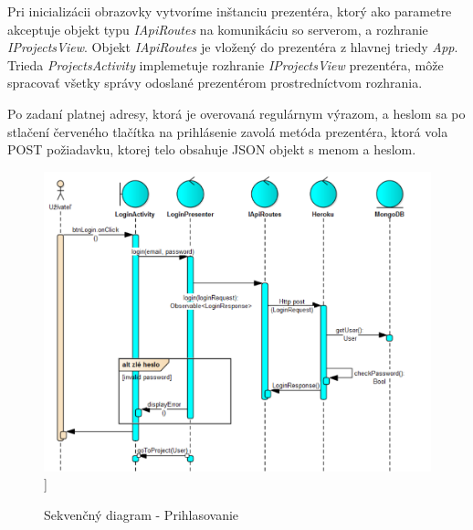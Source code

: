 Pri inicializácii obrazovky vytvoríme inštanciu prezentéra, ktorý ako parametre akceptuje objekt typu \textit{IApiRoutes} na komunikáciu so serverom, a rozhranie \textit{IProjectsView}. Objekt \textit{IApiRoutes}  je vložený do prezentéra z hlavnej triedy \textit{App}. Trieda \textit{ProjectsActivity} implemetuje rozhranie \textit{IProjectsView} prezentéra, môže spracovať všetky správy odoslané prezentérom prostredníctvom rozhrania.

Po zadaní platnej adresy, ktorá je overovaná regulárnym výrazom, a heslom sa po stlačení červeného tlačítka na prihlásenie  zavolá metóda prezentéra, ktorá vola POST požiadavku, ktorej telo obsahuje JSON objekt s menom a heslom.

\vspace{10pt}
\begin{figure}[H]

    \begin{center}
        \begin{minipage}{1\linewidth}
            \begin{center}
               \includegraphics[width=1\textwidth]{images/login_rest.png}]   
                \caption{Sekvenčný diagram - Prihlasovanie }
                \label{obr3.5}
            \end{center}
        \end{minipage}
    \end{center}
    
\end{figure}
\vspace{10pt}

